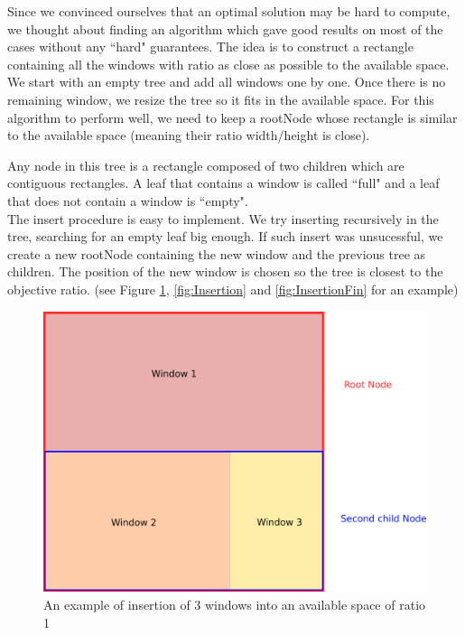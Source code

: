 \documentclass{acmtog}
\begin{document}
Since we convinced ourselves that an optimal solution may be hard to compute, we thought about finding an algorithm which gave good results on most of the cases without any ``hard" guarantees. The idea is to construct a rectangle containing all the windows with ratio as close as possible to the available space. We start with an empty tree and add all windows one by one. Once there is no remaining window, we resize the tree so it fits in the available space. For this algorithm to perform well, we need to keep a rootNode whose rectangle is similar to the available space (meaning their ratio width/height is close). 

Any node in this tree is a rectangle composed of two children which are contiguous rectangles. A leaf that contains a window is called ``full" and a leaf that does not contain a window is ``empty".  \\

The insert procedure is easy to implement. We try inserting recursively in the tree, searching for an empty leaf big enough. If such insert was unsucessful, we create a new rootNode containing the new window and the previous tree as children. The position of the new window is chosen so the tree is closest to the objective ratio. (see Figure \ref{fig:SimpleInsert}, \ref{fig:Insertion} and \ref{fig:InsertionFin} for an example)

\begin{figure}
  \includegraphics[width=\linewidth]{Images/1erDessin.png}
  \caption{An example of insertion of 3 windows into an available space of ratio 1}
  \label{fig:SimpleInsert}
\end{figure}
\end{document}
